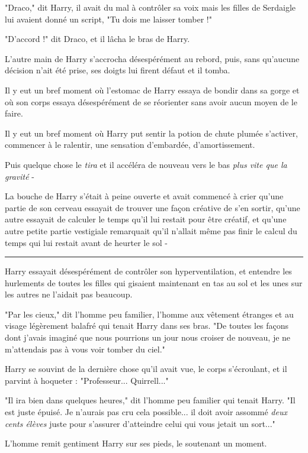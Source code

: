 "Draco," dit Harry, il avait du mal à contrôler sa voix mais les filles de Serdaigle lui avaient donné un script, "Tu dois me laisser tomber !"

"D'accord !" dit Draco, et il lâcha le bras de Harry.

L'autre main de Harry s'accrocha désespérément au rebord, puis, sans qu'aucune décision n'ait été prise, ses doigts lui firent défaut et il tomba.

Il y eut un bref moment où l'estomac de Harry essaya de bondir dans sa gorge et où son corps essaya désespérément de se réorienter sans avoir aucun moyen de le faire.

Il y eut un bref moment où Harry put sentir la potion de chute plumée s'activer, commencer à le ralentir, une sensation d'embardée, d'amortissement.

Puis quelque chose le \emph{tira}  et il accéléra de nouveau vers le bas \emph{plus vite que la gravité}  -

La bouche de Harry s'était à peine ouverte et avait commencé à crier qu'une partie de son cerveau essayait de trouver une façon créative de s'en sortir, qu'une autre essayait de calculer le temps qu'il lui restait pour être créatif, et qu'une autre petite partie vestigiale remarquait qu'il n'allait même pas finir le calcul du temps qui lui restait avant de heurter le sol -
\par\noindent\rule{\textwidth}{0.4pt}
Harry essayait désespérément de contrôler son hyperventilation, et entendre les hurlements de toutes les filles qui gisaient maintenant en tas au sol et les unes sur les autres ne l'aidait pas beaucoup.

"Par les cieux," dit l'homme peu familier, l'homme aux vêtement étranges et au visage légèrement balafré qui tenait Harry dans ses bras. "De toutes les façons dont j'avais imaginé que nous pourrions un jour nous croiser de nouveau, je ne m'attendais pas à vous voir tomber du ciel."

Harry se souvint de la dernière chose qu'il avait vue, le corps s'écroulant, et il parvint à hoqueter : "Professeur... Quirrell..."

"Il ira bien dans quelques heures," dit l'homme peu familier qui tenait Harry. "Il est juste épuisé. Je n'aurais pas cru cela possible... il doit avoir assommé \emph{deux cents élèves}  juste pour s'assurer d'atteindre celui qui vous jetait un sort..."

L'homme remit gentiment Harry sur ses pieds, le soutenant un moment.

